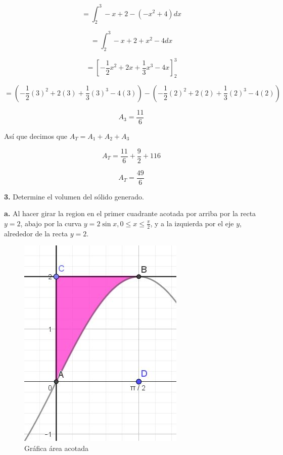 \documentclass[12pt]{article}
\begin{document}
\begin{flushleft}
$$=\int_{2}^{3}-x+2-\left ( -x ^{2}+4\right ) dx$$

$$=\int_{2}^{3}-x+2 +x ^{2}-4 dx$$

$$=\left[-\frac{1}{2}x^{2}+2x+\frac{1}{3}x^{3}-4x\right]_{2}^{3}$$


$$=\left(-\frac{1}{2}\left ( 3 \right )^{2}+2\left ( 3 \right )+\frac{1}{3}\left ( 3 \right )^{3}-4\left ( 3 \right )\right)-\left(-\frac{1}{2}\left ( 2\right )^{2}+2\left ( 2 \right )+\frac{1}{3}\left (2 \right )^{3}-4\left ( 2 \right )\right)$$


$$A_{3}=\frac{11}{6}$$

Así que decimos que $A_{T}=A_{1}+A_{2}+A_{3}$

$$A_{T}=\frac{11}{6}+\frac{9}{2}+{11}{6}$$

$$A_{T}=\frac{49}{6}$$
\vspace{0.5cm}



\newpage


\textbf{3.} Determine el volumen del sólido generado. 

\textbf{a.} Al hacer girar la region en el primer cuadrante acotada por arriba por la recta $y=2$, abajo por la curva $y=2\sin{x},0\leq x\leq \frac{\pi}{2}$, y a la izquierda por el eje $y$, alrededor de la recta $y=2$.

\begin{figure}[H]
    \centering
    \includegraphics[scale=0.38]{Barbie II.jpeg}
    \caption{Gráfica área acotada}
    \label{fig:enter-label}
\end{figure}


\end{flushleft}
\end{document}
